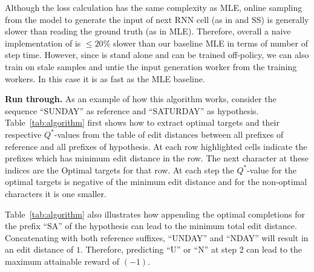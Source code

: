 \begin{appendices}
Although the loss calculation has the same complexity as MLE, online sampling from the model to generate the input of next RNN cell (as in \acronym and SS) is generally slower than reading the ground truth (as in MLE). Therefore, overall a naive implementation of \acronym is $\leq 20\%$ slower than our baseline MLE in terms of number of step time.  However, since \acronym is stand alone and can be trained off-policy, we can also train on stale samples and untie the input generation worker from the training workers. In this case it is as fast as the MLE baseline.

\setcounter{figure}{0} 
\setcounter{table}{0} 

{\bf Run through.} As an example of how this algorithm works, consider the sequence ``SUNDAY'' as reference and ``SATURDAY'' as hypothesis. Table~\ref{tab:algorithm} first shows how to extract optimal targets and their respective $Q^*$-values from the table of edit distances between all prefixes of reference and all prefixes of hypothesis. At each row highlighted cells indicate the prefixes which has minimum edit distance in the row. The next character at these indices are the Optimal targets for that row. At each step the $Q^*$-value for the optimal targets is negative of the minimum edit distance and for the non-optimal characters it is one smaller.

Table~\ref{tab:algorithm} also illustrates how appending the optimal completions for the prefix ``SA'' of the hypothesis can lead to the minimum total edit distance. Concatenating with both reference suffixes, ``UNDAY'' and ``NDAY'' will result in an edit distance of $1$. Therefore, predicting ``U'' or ``N'' at step 2 can lead to the maximum attainable reward of $(-1)$. 


\end{appendices}
